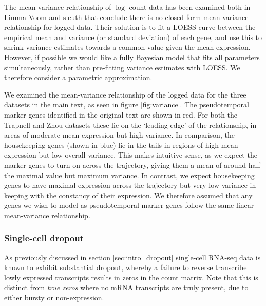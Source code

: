  The mean-variance relationship of $\log$ count data has been examined both in Limma Voom \cite{Law2014-tu}
 and sleuth \cite{Pimentel2016-xz} that conclude there is no closed form mean-variance relationship for logged data. Their solution is to fit a LOESS curve between the empirical mean and variance (or standard deviation) of each gene, and use this to shrink variance estimates towards a common value given the mean expression. However, if possible we would like a fully Bayesian model that fits all parameters simultaneously, rather than pre-fitting variance estimates with LOESS. We therefore consider a parametric approximation.

We examined the mean-variance relationship of the logged data for the three datasets in the main text, as seen in figure \ref{fig:variance}. The pseudotemporal marker genes identified in the original text are shown in red. For both the Trapnell and Zhou datasets these lie on the `leading edge' of the relationship, in areas of moderate mean expression but high variance. In comparison, the housekeeping genes (shown in blue) lie in the tails in regions of high mean expression but low overall variance. This makes intuitive sense, as we expect the marker genes to turn on across the trajectory, giving them a mean of around half the maximal value but maximum variance. In contrast, we expect housekeeping genes to have maximal expression across the trajectory but very low variance in keeping with the constancy of their expression. We therefore assumed that any genes we wish to model as pseudotemporal marker genes follow the same linear mean-variance relationship. 



\subsubsection{Single-cell dropout}



As previously discussed in section \ref{sec:intro_dropout} single-cell RNA-seq data is known to exhibit substantial dropout, whereby a failure to reverse transcribe lowly expressed transcripts results in zeros in the count matrix. Note that this is distinct from \emph{true zeros} where no mRNA transcripts are truly present, due to either bursty or non-expression.

